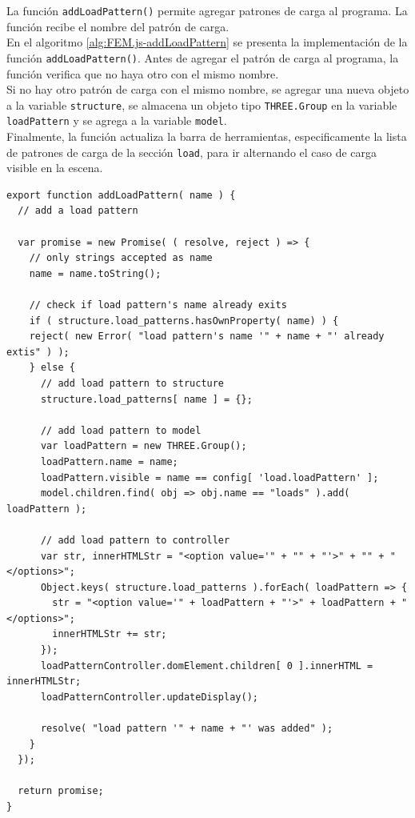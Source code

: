 La función \verb|addLoadPattern()| permite agregar patrones de carga al programa. La función recibe el nombre del patrón de carga.\\

En el algoritmo \ref{alg:FEM.js-addLoadPattern} se presenta la implementación de la función \verb|addLoadPattern()|. Antes de agregar el patrón de carga al programa, la función verifica que no haya otro con el mismo nombre.\\

Si no hay otro patrón de carga con el mismo nombre, se agregar una nueva objeto a la variable \verb|structure|, se almacena un objeto tipo \verb|THREE.Group| en la variable \verb|loadPattern| y se agrega a la variable \verb|model|.\\

Finalmente, la función actualiza la barra de herramientas, especificamente la lista de patrones de carga de la sección \verb|load|, para ir alternando el caso de carga visible en la escena.\\

\begin{lstlisting}[language={},caption=Función \texttt{addLoadPattern()} implementada en el archivo \texttt{FEM.js}.,label=alg:FEM.js-addLoadPattern, frame=single]
export function addLoadPattern( name ) {
  // add a load pattern

  var promise = new Promise( ( resolve, reject ) => {
    // only strings accepted as name
    name = name.toString();

    // check if load pattern's name already exits
    if ( structure.load_patterns.hasOwnProperty( name) ) {
    reject( new Error( "load pattern's name '" + name + "' already extis" ) );
    } else {
      // add load pattern to structure
      structure.load_patterns[ name ] = {};

      // add load pattern to model
      var loadPattern = new THREE.Group();
      loadPattern.name = name;
      loadPattern.visible = name == config[ 'load.loadPattern' ];
      model.children.find( obj => obj.name == "loads" ).add( loadPattern );

      // add load pattern to controller
      var str, innerHTMLStr = "<option value='" + "" + "'>" + "" + "</options>";
      Object.keys( structure.load_patterns ).forEach( loadPattern => {
        str = "<option value='" + loadPattern + "'>" + loadPattern + "</options>";
        innerHTMLStr += str;
      });
      loadPatternController.domElement.children[ 0 ].innerHTML = innerHTMLStr;
      loadPatternController.updateDisplay();

      resolve( "load pattern '" + name + "' was added" );
    }
  });

  return promise;
}
\end{lstlisting}

